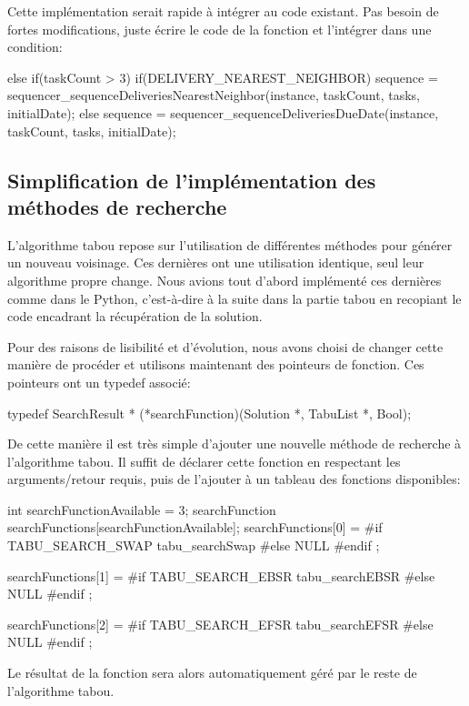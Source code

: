 \documentclass[hideweeklyreports]{polytech/polytech}
\begin{document}
				Cette implémentation serait rapide à intégrer au code existant. Pas besoin de fortes modifications, juste écrire le code de la fonction et l'intégrer dans une condition:
				\begin{csource}
else if(taskCount > 3)
{
	if(DELIVERY_NEAREST_NEIGHBOR)
		sequence = sequencer_sequenceDeliveriesNearestNeighbor(instance, taskCount, tasks, initialDate);
	else
		sequence = sequencer_sequenceDeliveriesDueDate(instance, taskCount, tasks, initialDate);
}
				\end{csource}
				
				\subsection{\label{searchfunc}Simplification de l'implémentation des méthodes de recherche}
				L'algorithme tabou repose sur l'utilisation de différentes méthodes pour générer un nouveau voisinage. Ces dernières ont une utilisation identique, seul leur algorithme propre change. Nous avions tout d'abord implémenté ces dernières comme dans le Python, c'est-à-dire à la suite dans la partie tabou en recopiant le code encadrant la récupération de la solution.
				
				Pour des raisons de lisibilité et d'évolution, nous avons choisi de changer cette manière de procéder et utilisons maintenant des pointeurs de fonction. Ces pointeurs ont un typedef associé:
				\begin{csource}
typedef SearchResult * (*searchFunction)(Solution *, TabuList *, Bool);
				\end{csource}
				
				De cette manière il est très simple d'ajouter une nouvelle méthode de recherche à l'algorithme tabou. Il suffit de déclarer cette fonction en respectant les arguments/retour requis, puis de l'ajouter à un tableau des fonctions disponibles:
				\begin{csource}
int searchFunctionAvailable = 3;
searchFunction searchFunctions[searchFunctionAvailable];
searchFunctions[0] =
	#if TABU_SEARCH_SWAP
		tabu_searchSwap
	#else
		NULL
	#endif
;

searchFunctions[1] =
	#if TABU_SEARCH_EBSR
		tabu_searchEBSR
	#else
		NULL
	#endif
;

searchFunctions[2] =
	#if TABU_SEARCH_EFSR
		tabu_searchEFSR
	#else
		NULL
	#endif
;
				\end{csource}
				
				Le résultat de la fonction sera alors automatiquement géré par le reste de l'algorithme tabou.
			
\end{document}
